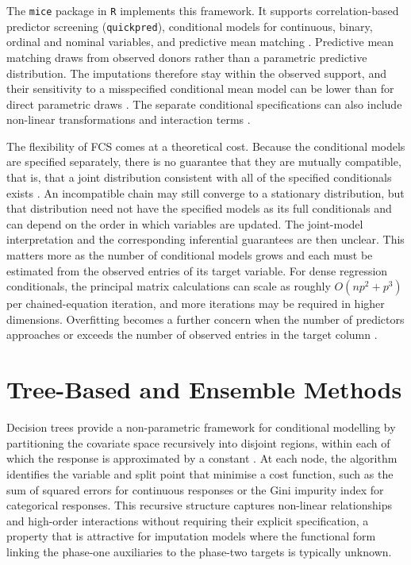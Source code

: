 The \texttt{mice} package in \texttt{R} \citep{vanBuuren2011} implements this framework. It supports correlation-based predictor screening (\texttt{quickpred}), conditional models for continuous, binary, ordinal and nominal variables, and predictive mean matching \citep{little1988missing}. Predictive mean matching draws from observed donors rather than a parametric predictive distribution. The imputations therefore stay within the observed support, and their sensitivity to a misspecified conditional mean model can be lower than for direct parametric draws \citep{morris2014tuning}. The separate conditional specifications can also include non-linear transformations and interaction terms \citep{vanBuuren2018}.

The flexibility of FCS comes at a theoretical cost. Because the conditional models are specified separately, there is no guarantee that they are mutually compatible, that is, that a joint distribution consistent with all of the specified conditionals exists \citep{vanBuuren2018, white2011multiple}. An incompatible chain may still converge to a stationary distribution, but that distribution need not have the specified models as its full conditionals and can depend on the order in which variables are updated. The joint-model interpretation and the corresponding inferential guarantees are then unclear. This matters more as the number of conditional models grows and each must be estimated from the observed entries of its target variable. For dense regression conditionals, the principal matrix calculations can scale as roughly $O(np^2+p^3)$ per chained-equation iteration, and more iterations may be required in higher dimensions. Overfitting becomes a further concern when the number of predictors approaches or exceeds the number of observed entries in the target column \citep{zhu2015multiple, deng2016multiple}.

\section{Tree-Based and Ensemble Methods}
\label{sec:trees}

Decision trees provide a non-parametric framework for conditional modelling by partitioning the covariate space recursively into disjoint regions, within each of which the response is approximated by a constant \citep{breiman1984classification}. At each node, the algorithm identifies the variable and split point that minimise a cost function, such as the sum of squared errors for continuous responses or the Gini impurity index for categorical responses. This recursive structure captures non-linear relationships and high-order interactions without requiring their explicit specification, a property that is attractive for imputation models where the functional form linking the phase-one auxiliaries to the phase-two targets is typically unknown.

